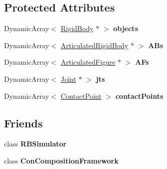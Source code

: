 \subsection*{Protected Attributes}
\begin{DoxyCompactItemize}
\item 
\hypertarget{classCartWheel_1_1Physics_1_1World_a380bec6508d5c05cd3f544520881ff84}{
DynamicArray$<$ \hyperlink{classCartWheel_1_1Physics_1_1RigidBody}{RigidBody} $\ast$ $>$ {\bfseries objects}}
\label{classCartWheel_1_1Physics_1_1World_a380bec6508d5c05cd3f544520881ff84}

\item 
\hypertarget{classCartWheel_1_1Physics_1_1World_a491aeb2bf831fba4628bb321af6a5c8d}{
DynamicArray$<$ \hyperlink{classCartWheel_1_1Physics_1_1ArticulatedRigidBody}{ArticulatedRigidBody} $\ast$ $>$ {\bfseries ABs}}
\label{classCartWheel_1_1Physics_1_1World_a491aeb2bf831fba4628bb321af6a5c8d}

\item 
\hypertarget{classCartWheel_1_1Physics_1_1World_a9db57b524654e43d5961d9137d10b999}{
DynamicArray$<$ \hyperlink{classCartWheel_1_1Physics_1_1ArticulatedFigure}{ArticulatedFigure} $\ast$ $>$ {\bfseries AFs}}
\label{classCartWheel_1_1Physics_1_1World_a9db57b524654e43d5961d9137d10b999}

\item 
\hypertarget{classCartWheel_1_1Physics_1_1World_a06985121ecaba64b39b94e8f7d22f990}{
DynamicArray$<$ \hyperlink{classCartWheel_1_1Physics_1_1Joint}{Joint} $\ast$ $>$ {\bfseries jts}}
\label{classCartWheel_1_1Physics_1_1World_a06985121ecaba64b39b94e8f7d22f990}

\item 
\hypertarget{classCartWheel_1_1Physics_1_1World_a8470449ef5101275e1f84a77cb9d1989}{
DynamicArray$<$ \hyperlink{classCartWheel_1_1Physics_1_1ContactPoint}{ContactPoint} $>$ {\bfseries contactPoints}}
\label{classCartWheel_1_1Physics_1_1World_a8470449ef5101275e1f84a77cb9d1989}

\end{DoxyCompactItemize}
\subsection*{Friends}
\begin{DoxyCompactItemize}
\item 
\hypertarget{classCartWheel_1_1Physics_1_1World_a17c0908c8cdc36f732cad4b694ead2ed}{
class {\bfseries RBSimulator}}
\label{classCartWheel_1_1Physics_1_1World_a17c0908c8cdc36f732cad4b694ead2ed}

\item 
\hypertarget{classCartWheel_1_1Physics_1_1World_a2186d44ce4e417600cf0ff435fd6f6b5}{
class {\bfseries ConCompositionFramework}}
\label{classCartWheel_1_1Physics_1_1World_a2186d44ce4e417600cf0ff435fd6f6b5}

\end{DoxyCompactItemize}


